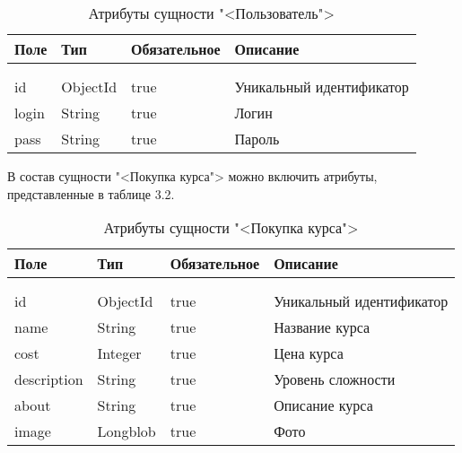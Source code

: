 \begin{xltabular}{\textwidth}{|l|l|p{1.7cm}|X|}
	\caption{Атрибуты сущности "<Пользователь">\label{news:table}}\\ \hline
	\centrow Поле & \centrow Тип & \centrow Обяза\-тельное & \centrow Описание \\ \hline
	 &  &  &  \\ \hline
	\endfirsthead
	 &  &  &  \\ \hline
	\finishhead
	id & ObjectId & true & Уникальный идентификатор \\ \hline 
	login & String & true & Логин \\ \hline 
	pass & String & true & Пароль \\ \hline 
\end{xltabular}

В состав сущности "<Покупка курса"> можно включить атрибуты, представленные в таблице 3.2.

\begin{xltabular}{\textwidth}{|l|l|p{1.7cm}|X|}
	\caption{Атрибуты сущности "<Покупка курса">\label{news:table}}\\ \hline
	\centrow Поле & \centrow Тип & \centrow Обяза\-тельное & \centrow Описание \\ \hline
	 &  &  &  \\ \hline
	\endfirsthead
	 &  &  &  \\ \hline
	\finishhead
	id & ObjectId & true & Уникальный идентификатор \\ \hline 
	name & String & true & Название курса \\ \hline 
	cost & Integer & true & Цена курса \\ \hline 
	description & String & true & Уровень сложности \\ \hline 
	about & String & true & Описание курса \\ \hline
	image & Longblob & true & Фото \\ \hline 
\end{xltabular}